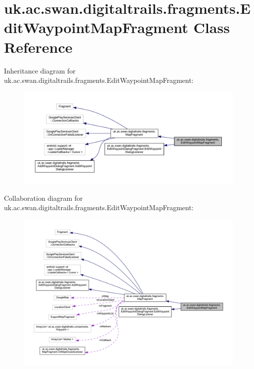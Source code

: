 \hypertarget{classuk_1_1ac_1_1swan_1_1digitaltrails_1_1fragments_1_1_edit_waypoint_map_fragment}{\section{uk.\+ac.\+swan.\+digitaltrails.\+fragments.\+Edit\+Waypoint\+Map\+Fragment Class Reference}
\label{classuk_1_1ac_1_1swan_1_1digitaltrails_1_1fragments_1_1_edit_waypoint_map_fragment}
}


Inheritance diagram for uk.\+ac.\+swan.\+digitaltrails.\+fragments.\+Edit\+Waypoint\+Map\+Fragment\+:\nopagebreak
\begin{figure}[H]
\begin{center}
\leavevmode
\includegraphics[width=350pt]{classuk_1_1ac_1_1swan_1_1digitaltrails_1_1fragments_1_1_edit_waypoint_map_fragment__inherit__graph}
\end{center}
\end{figure}


Collaboration diagram for uk.\+ac.\+swan.\+digitaltrails.\+fragments.\+Edit\+Waypoint\+Map\+Fragment\+:\nopagebreak
\begin{figure}[H]
\begin{center}
\leavevmode
\includegraphics[width=350pt]{classuk_1_1ac_1_1swan_1_1digitaltrails_1_1fragments_1_1_edit_waypoint_map_fragment__coll__graph}
\end{center}
\end{figure}
